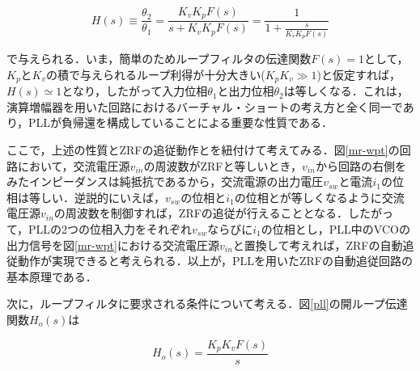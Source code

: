 \begin{equation}
H(s) \equiv \frac{\theta_2}{\theta_1}=\frac{K_v K_p F(s)}{s+K_v K_p F(s)}=\frac{1}{1+\frac{s}{K_v K_p F(s)}}
\end{equation}

で与えられる．いま，簡単のためループフィルタの伝達関数$F(s)=1$として，$K_p$と$K_v$の積で与えられるループ利得が十分大きい($K_pK_v \gg 1$)と仮定すれば，$H(s) \simeq 1$となり，したがって入力位相$\theta_1$と出力位相$\theta_2$は等しくなる．これは，演算増幅器を用いた回路におけるバーチャル・ショートの考え方と全く同一であり，PLLが負帰還を構成していることによる重要な性質である．\par 
ここで，上述の性質とZRFの追従動作とを紐付けて考えてみる．図\ref{mr-wpt}の回路において，交流電圧源$v_{in}$の周波数がZRFと等しいとき，$v_{in}$から回路の右側をみたインピーダンスは純抵抗であるから，交流電源の出力電圧$v_{sw}$と電流$i_1$の位相は等しい．逆説的にいえば，$v_{sw}$の位相と$i_1$の位相とが等しくなるように交流電圧源$v_{in}$の周波数を制御すれば，ZRFの追従が行えることとなる．したがって，PLLの2つの位相入力をそれぞれ$v_{sw}$ならびに$i_1$の位相とし，PLL中のVCOの出力信号を図\ref{mr-wpt}における交流電圧源$v_{in}$と置換して考えれば，ZRFの自動追従動作が実現できると考えられる．以上が，PLLを用いたZRFの自動追従回路の基本原理である．\par 
次に，ループフィルタに要求される条件について考える．図\ref{pll}の開ループ伝達関数$H_o(s)$は

\begin{equation}
H_o(s) = \frac{K_p K_v F(s)}{s}
\end{equation}

